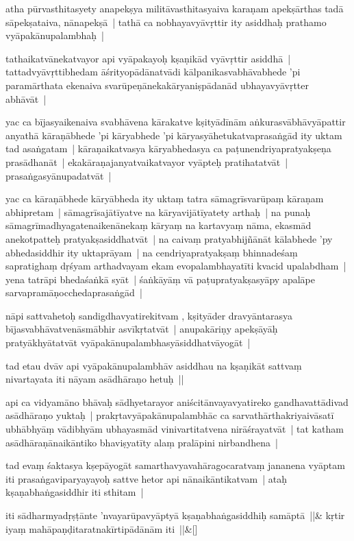\documentclass[article,12pt,a4paper]{memoir}
\begin{document}
	  \pstart atha pūrvasthitasyety anapekṣya militāvasthitasyaiva karaṇam apekṣārthas tadā sāpekṣataiva, nānapekṣā | tathā ca nobhayavyāvṛttir ity asiddhaḥ prathamo vyāpakānupalambhaḥ | 
	\pend
      

	  \pstart tathaikatvānekatvayor api vyāpakayoḥ kṣaṇikād vyāvṛttir asiddhā | tattadvyāvṛttibhedam āśrityopādānatvādi kālpanikasvabhāvabhede 'pi paramārthata ekenaiva svarūpeṇānekakāryaniṣpādanād ubhayavyāvṛtter abhāvāt |
	\pend
      

	  \pstart yac ca bījasyaikenaiva svabhāvena kārakatve kṣityādīnām aṅkurasvābhāvyāpattir anyathā kāraṇābhede 'pi kāryabhede 'pi kāryasyāhetukatvaprasaṅgād ity uktam tad asaṅgatam | kāraṇaikatvasya kāryabhedasya ca paṭunendriyapratyakṣeṇa prasādhanāt | ekakāraṇajanyatvaikatvayor vyāpteḥ pratihatatvāt | prasaṅgasyānupadatvāt |
	\pend
      

	  \pstart yac ca kāraṇābhede kāryābheda ity uktaṃ tatra sāmagrīsvarūpaṃ kāraṇam abhipretam | sāmagrīsajātīyatve na kāryavijātīyatety arthaḥ | na punaḥ sāmagrīmadhyagatenaikenānekaṃ kāryaṃ na kartavyaṃ nāma, ekasmād anekotpatteḥ pratyakṣasiddhatvāt | na caivaṃ pratyabhijñānāt kālabhede 'py abhedasiddhir ity uktaprāyam | na cendriyapratyakṣaṃ bhinnadeśaṃ sapratighaṃ dṛśyam arthadvayam ekam evopalambhayatīti kvacid upalabdham | yena tatrāpi bhedaśaṅkā syāt | śaṅkāyāṃ vā paṭupratyakṣasyāpy apalāpe sarvapramāṇocchedaprasaṅgād |
	\pend
      

	  \pstart nāpi sattvahetoḥ sandigdhavyatirekitvam , kṣityāder dravyāntarasya bījasvabhāvatvenāsmābhir asvīkṛtatvāt | anupakāriṇy apekṣāyāḥ pratyākhyātatvāt vyāpakānupalambhasyāsiddhatvāyogāt |
	\pend
      

	  \pstart tad etau dvāv api vyāpakānupalambhāv asiddhau na kṣaṇikāt sattvaṃ nivartayata iti nāyam asādhāraṇo hetuḥ ||
	\pend
      

	  \pstart api ca vidyamāno bhāvaḥ sādhyetarayor aniścitānvayavyatireko gandhavattādivad asādhāraṇo yuktaḥ | prakṛtavyāpakānupalambhāc ca sarvathārthakriyaivāsatī ubhābhyāṃ vādibhyām ubhayasmād vinivartitatvena nirāśrayatvāt | tat katham asādhāraṇānaikāntiko bhaviṣyatīty alaṃ pralāpini nirbandhena |
	\pend
      

	  \pstart tad evaṃ śaktasya kṣepāyogāt samarthavyavahāragocaratvaṃ jananena vyāptam iti prasaṅgaviparyayayoḥ sattve hetor api nānaikāntikatvam | ataḥ kṣaṇabhaṅgasiddhir iti sthitam |
	\pend
      
	    
	    \stanza[\smallbreak]
	\label{thakur75-82.15} iti sādharmyadṛṣṭānte 'nvayarūpavyāptyā kṣaṇabhaṅgasiddhiḥ samāptā ||&\label{thakur75-82.17} kṛtir iyaṃ mahāpaṇḍitaratnakīrtipādānām iti ||\&[\smallbreak]
\end{document}
